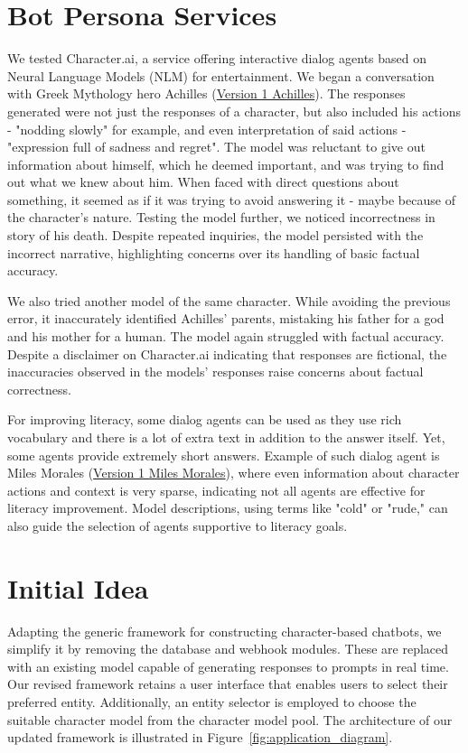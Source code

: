 \documentclass[fleqn,moreauthors,10pt]{ds_report}
\begin{document}
\section*{Bot Persona Services}

We tested Character.ai, a service offering interactive dialog agents based on Neural Language Models (NLM) for entertainment. We began a conversation with Greek Mythology hero Achilles (\href{https://character.ai/chat/EBMwCtvGQWrCk_xeglpGWfQiCJOCkGu7PMWbEWLINlY}{Version 1 Achilles}). 
The responses generated were not just the responses of a character, but also included his actions - "nodding slowly" for example, and even interpretation of said actions - "expression full of sadness and regret". The model was reluctant to give out information about himself, which he deemed important, and was trying to find out what we knew about him. When faced with direct questions about something, it seemed as if it was trying to avoid answering it - maybe because of the character's nature. Testing the model further, we noticed incorrectness in story of his death. Despite repeated inquiries, the model persisted with the incorrect narrative, highlighting concerns over its handling of basic factual accuracy. 

We also tried another model of the same character. While avoiding the previous error, it inaccurately identified Achilles' parents, mistaking his father for a god and his mother for a human. The model again struggled with factual accuracy. Despite a disclaimer on Character.ai indicating that responses are fictional, the inaccuracies observed in the models' responses raise concerns about factual correctness.

For improving literacy, some dialog agents can be used as they use rich vocabulary and there is a lot of extra text in addition to the answer itself. Yet, some agents provide extremely short answers. Example of such dialog agent is Miles Morales (\href{ttps://character.ai/chat/KfUosnPgcC9hoTWbJq_2z1cQi-719T8cldRLa2fTb1Y}{Version 1 Miles Morales}), where even information about character actions and context is very sparse, indicating not all agents are effective for literacy improvement. Model descriptions, using terms like "cold" or "rude," can also guide the selection of agents supportive to literacy goals.

\section*{Initial Idea}
    Adapting the generic framework for constructing character-based chatbots, we simplify it by removing the database and webhook modules. These are replaced with an existing model capable of generating responses to prompts in real time. Our revised framework retains a user interface that enables users to select their preferred entity. Additionally, an entity selector is employed to choose the suitable character model from the character model pool. The architecture of our updated framework is illustrated in Figure~\ref{fig:application_diagram}.
\end{document}

